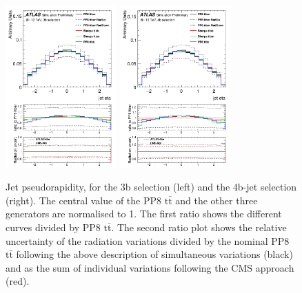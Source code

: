 \begin{figure}[!htb]
\centering
\includegraphics[width=0.38\textwidth]{Plots/ttbb/his3b_jeteta__div}
\includegraphics[width=0.38\textwidth]{Plots/ttbb/his4b_jeteta__div}
  \caption{Jet pseudorapidity, for the 3b selection (left) and the 4b-jet selection (right). The central value of the PP8 $\mathrm{t\bar{t}}$ and the other three generators are normalised to 1. The first ratio shows the different curves divided by PP8 $\mathrm{t\bar{t}}$. The second ratio plot shows the relative uncertainty of the radiation variations divided by the nominal PP8 $\mathrm{t\bar{t}}$ following the above description of simultaneous variations (black) and as the sum of individual variations following the CMS approach (red). \label{ttbb:jeteta}}
\end{figure}